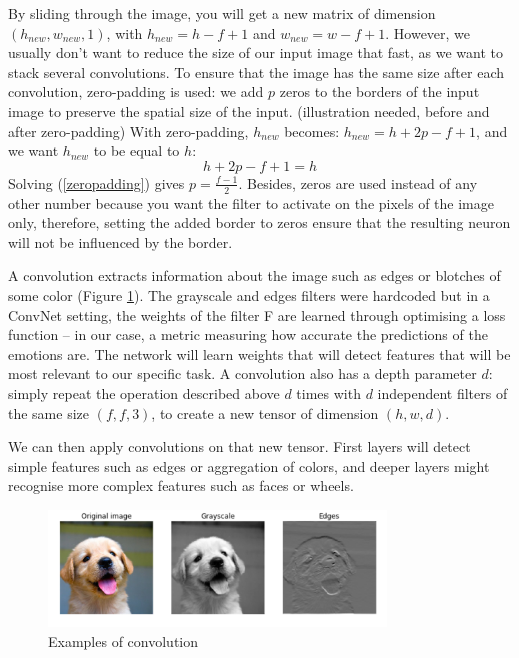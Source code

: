By sliding through the image, you will get a new matrix of dimension $(h_{new}, w_{new},1)$, with $h_{new}=h-f+1$ and $w_{new}=w-f+1$. However, we usually don't want to reduce the size of our input image that fast, as we want to stack several convolutions. To ensure that the image has the same size after each convolution, zero-padding is used: we add $p$ zeros to the borders of the input image to preserve the spatial size of the input. (illustration needed, before and after zero-padding) With zero-padding, $h_{new}$ becomes: $h_{new} =  h + 2p - f + 1$, and we want $h_{new}$ to be equal to $h$:
\begin{equation}
    h + 2p - f + 1 = h
    \label{zeropadding}
\end{equation}
Solving (\ref{zeropadding}) gives $p=\frac{f-1}{2}$. Besides, zeros are used instead of any other number because you want the filter to activate on the pixels of the image only, therefore, setting the added border to zeros ensure that the resulting neuron will not be influenced by the border.

A convolution extracts information about the image such as edges or blotches of some color (Figure \ref{conv-ex}). The grayscale and edges filters were hardcoded but in a ConvNet setting, the weights of the filter F are learned through optimising a loss function -- in our case, a metric measuring how accurate the predictions of the emotions are. The network will learn weights that will detect features that will be most relevant to our specific task. A convolution also has a depth parameter $d$: simply repeat the operation described above $d$ times with $d$ independent filters of the same size $(f, f, 3)$, to create a new tensor of dimension $(h,w,d)$.

We can then apply convolutions on that new tensor. First layers will detect simple features such as edges or aggregation of colors, and deeper layers might recognise more complex features such as faces or wheels.

\begin{figure}
\centering
\includegraphics[width=0.8\textwidth]{Images/conv_ex.png}
\caption{Examples of convolution}
\label{conv-ex}
\end{figure}

